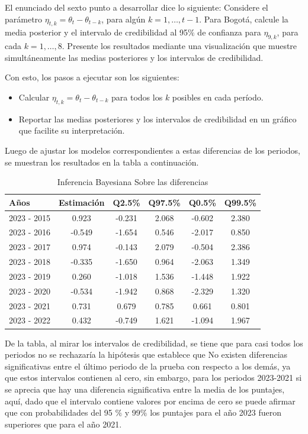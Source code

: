 \documentclass[12pt]{article}
\begin{document}
El enunciado del sexto punto a desarrollar dice lo siguiente:  Considere el parámetro $\eta_{t,k} = \theta_t-\theta_{t-k}$, para algún $k=1,\ldots,t-1$. Para Bogotá, calcule la media posterior y el intervalo de credibilidad al 95$\%$ de confianza para $\eta_{9,k}$, para cada $k=1,\ldots,8$. Presente los resultados mediante una visualización que muestre simultáneamente las medias posteriores y los intervalos de credibilidad.

Con esto, los pasos a ejecutar son los siguientes:

\begin{itemize}
    \item Calcular  $\eta_{t,k} = \theta_t-\theta_{t-k}$ para todos los $k$ posibles en cada período.
    \item Reportar las medias posteriores y los intervalos de credibilidad en un gráfico que facilite su interpretación.
\end{itemize}

Luego de ajustar los modelos correspondientes a estas diferencias de los periodos, se muestran los resultados en la tabla a continuación.\\
\begin{table}[H]
\centering
\begin{tabular}{lccccc}
\hline
\textbf{Años} & \textbf{Estimación} & \textbf{Q2.5\%} & \textbf{Q97.5\%} & \textbf{Q0.5\%} & \textbf{Q99.5\%} \\
\hline
2023 - 2015 & 0.923 & -0.231 & 2.068 & -0.602 & 2.380 \\
2023 - 2016 & -0.549 & -1.654 & 0.546 & -2.017 & 0.850 \\
2023 - 2017 & 0.974 & -0.143 & 2.079 & -0.504 & 2.386 \\
2023 - 2018 & -0.335 & -1.650 & 0.964 & -2.063 & 1.349 \\
2023 - 2019 & 0.260 & -1.018 & 1.536 & -1.448 & 1.922 \\
2023 - 2020 & -0.534 & -1.942 & 0.868 & -2.329 & 1.320 \\
2023 - 2021 & 0.731 & 0.679 & 0.785 & 0.661 & 0.801 \\
2023 - 2022 & 0.432 & -0.749 & 1.621 & -1.094 & 1.967 \\
\hline
\end{tabular}
\caption{Inferencia Bayesiana Sobre las diferencias}
\label{tab:diferencias-bayesianas}
\end{table}

De la tabla, al mirar los intervalos de credibilidad, se tiene que para casi todos los periodos no se rechazaría la hipótesis que establece que No existen diferencias significativas entre el último periodo de la prueba con respecto a los demás, ya que estos intervalos contienen al cero, sin embargo, para los periodos 2023-2021 si se aprecia que hay una diferencia significativa entre la media de los puntajes, aquí, dado que el intervalo contiene valores por encima de cero se puede afirmar que con probabilidades del 95 $\%$ y 99$\%$ los puntajes para el año 2023 fueron superiores que para el año 2021.\\
\end{document}
